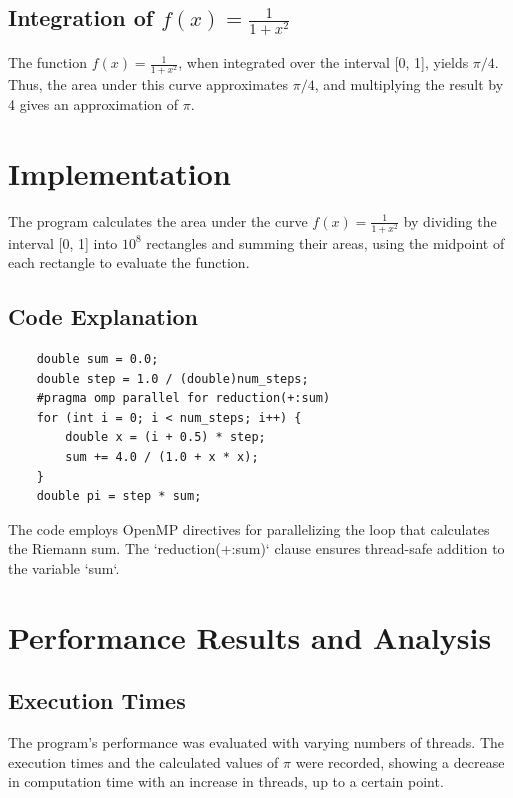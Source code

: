 \documentclass[11pt]{article}
\begin{document}
    \subsection{Integration of $f(x) = \frac{1}{1+x^2}$}
    The function $f(x) = \frac{1}{1+x^2}$, when integrated over the interval [0, 1], yields $\pi/4$. Thus, the area under this curve approximates $\pi/4$, and multiplying the result by 4 gives an approximation of $\pi$.

    \section{Implementation}
    The program calculates the area under the curve $f(x) = \frac{1}{1+x^2}$ by dividing the interval [0, 1] into $10^8$ rectangles and summing their areas, using the midpoint of each rectangle to evaluate the function. 

    \subsection{Code Explanation}
    \begin{verbatim}
    double sum = 0.0;
    double step = 1.0 / (double)num_steps;
    #pragma omp parallel for reduction(+:sum)
    for (int i = 0; i < num_steps; i++) {
        double x = (i + 0.5) * step;
        sum += 4.0 / (1.0 + x * x);
    }
    double pi = step * sum;
    \end{verbatim}
    The code employs OpenMP directives for parallelizing the loop that calculates the Riemann sum. The `reduction(+:sum)` clause ensures thread-safe addition to the variable `sum`.

    \section{Performance Results and Analysis}
    \subsection{Execution Times}
    The program's performance was evaluated with varying numbers of threads. The execution times and the calculated values of $\pi$ were recorded, showing a decrease in computation time with an increase in threads, up to a certain point.
\end{document}
